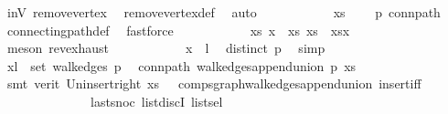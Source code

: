 \begin{isabellebody}
\ inV{\isacharprime}{\kern0pt}\ remove{\isacharunderscore}{\kern0pt}vertex\ \isamarkupfalse%
\ remove{\isacharunderscore}{\kern0pt}vertex{\isacharunderscore}{\kern0pt}def\ \isamarkupfalse%
\ auto\isanewline
\ \ \ \ \ \ \ \ \isamarkupfalse%
\ \isamarkupfalse%
\ {\isachardoublequoteopen}xs\ {\isasymnoteq}\ {\isacharbrackleft}{\kern0pt}{\isacharbrackright}{\kern0pt}{\isachardoublequoteclose}\ \isamarkupfalse%
\ p\ conn{\isacharunderscore}{\kern0pt}path\ \isamarkupfalse%
\ connecting{\isacharunderscore}{\kern0pt}path{\isacharunderscore}{\kern0pt}def\ \isamarkupfalse%
\ fastforce\isanewline
\ \ \ \ \ \ \ \ \isamarkupfalse%
\ \isamarkupfalse%
\ xs{\isacharprime}{\kern0pt}\ x\ \ xs{\isacharcolon}{\kern0pt}\ {\isachardoublequoteopen}xs\ {\isacharequal}{\kern0pt}\ xs{\isacharprime}{\kern0pt}{\isacharat}{\kern0pt}{\isacharbrackleft}{\kern0pt}x{\isacharbrackright}{\kern0pt}{\isachardoublequoteclose}\ \isamarkupfalse%
\ {\isacharparenleft}{\kern0pt}meson\ rev{\isacharunderscore}{\kern0pt}exhaust{\isacharparenright}{\kern0pt}\isanewline
\ \ \ \ \ \ \ \ \isamarkupfalse%
\ \isamarkupfalse%
\ {\isachardoublequoteopen}x\ {\isasymnoteq}\ l{\isachardoublequoteclose}\ \isamarkupfalse%
\ distinct\ p\ \isamarkupfalse%
\ simp\isanewline
\ \ \ \ \ \ \ \ \isamarkupfalse%
\ {\isachardoublequoteopen}{\isacharbraceleft}{\kern0pt}x{\isacharcomma}{\kern0pt}l{\isacharbraceright}{\kern0pt}\ {\isasymin}\ set\ {\isacharparenleft}{\kern0pt}walk{\isacharunderscore}{\kern0pt}edges\ p{\isacharparenright}{\kern0pt}{\isachardoublequoteclose}\ \isamarkupfalse%
\ conn{\isacharunderscore}{\kern0pt}path\ walk{\isacharunderscore}{\kern0pt}edges{\isacharunderscore}{\kern0pt}append{\isacharunderscore}{\kern0pt}union\ p\ xs\isanewline
\ \ \ \ \ \ \ \ \ \ \isamarkupfalse%
\ {\isacharparenleft}{\kern0pt}smt\ {\isacharparenleft}{\kern0pt}verit{\isacharparenright}{\kern0pt}\ Un{\isacharunderscore}{\kern0pt}insert{\isacharunderscore}{\kern0pt}right\ {\isacartoucheopen}xs\ {\isasymnoteq}\ {\isacharbrackleft}{\kern0pt}{\isacharbrackright}{\kern0pt}{\isacartoucheclose}\ comp{\isacharunderscore}{\kern0pt}sgraph{\isachardot}{\kern0pt}walk{\isacharunderscore}{\kern0pt}edges{\isacharunderscore}{\kern0pt}append{\isacharunderscore}{\kern0pt}union\ insert{\isacharunderscore}{\kern0pt}iff\isanewline
\ \ \ \ \ \ \ \ \ \ \ \ \ \ last{\isacharunderscore}{\kern0pt}snoc\ list{\isachardot}{\kern0pt}discI\ list{\isachardot}{\kern0pt}sel{\isacharparenleft}{\kern0pt}{}{\isacharparenright}{\kern0pt}{\isacharparenright}{\kern0pt}\isanewline

\end{isabellebody}
